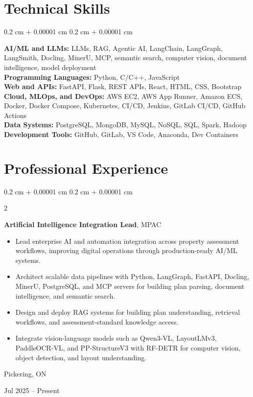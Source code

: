 \documentclass[10pt, letterpaper]{article}
\newenvironment{highlights}{
    \begin{itemize}[
        topsep=0.10 cm,
        parsep=0.10 cm,
        partopsep=0pt,
        itemsep=0pt,
        leftmargin=0.4 cm + 10pt
    ]
}{
    \end{itemize}
} %
\newenvironment{onecolentry}{
    \begin{adjustwidth}{
        0.2 cm + 0.00001 cm
    }{
        0.2 cm + 0.00001 cm
    }
}{
    \end{adjustwidth}
} %
\newenvironment{twocolentry}[2][]{
    \onecolentry
    \def\secondColumn{#2}
    \setcolumnwidth{\fill, 4.5 cm}
    \begin{paracol}{2}
}{
    \switchcolumn \raggedleft \secondColumn
    \end{paracol}
    \endonecolentry
} %
\let\hrefWithoutArrow\href
\renewcommand{\href}[2]{\hrefWithoutArrow{#1}{#2}}
\begin{document}
        \vspace{-0.2 cm}

\section{Technical Skills}
\begin{onecolentry}
\textbf{AI/ML and LLMs:} LLMs, RAG, Agentic AI, LangChain, LangGraph, LangSmith, Docling, MinerU, MCP, semantic search, computer vision, document intelligence, model deployment\\
\textbf{Programming Languages:} Python, C/C++, JavaScript\\
\textbf{Web and APIs:} FastAPI, Flask, REST APIs, React, HTML, CSS, Bootstrap\\
\textbf{Cloud, MLOps, and DevOps:} AWS EC2, AWS App Runner, Amazon ECS, Docker, Docker Compose, Kubernetes, CI/CD, Jenkins, GitLab CI/CD, GitHub Actions\\
\textbf{Data Systems:} PostgreSQL, MongoDB, MySQL, NoSQL, SQL, Spark, Hadoop\\
\textbf{Development Tools:} GitHub, GitLab, VS Code, Anaconda, Dev Containers
\end{onecolentry}

        
\vspace{-0.2 cm}
\section{Professional Experience}

\begin{twocolentry}{
    Pickering, ON 

    Jul 2025 – Present
}
    \textbf{Artificial Intelligence Integration Lead}, MPAC


\begin{highlights}
    \item Lead enterprise AI and automation integration across property assessment workflows, improving digital operations through production-ready AI/ML systems.
    \item Architect scalable data pipelines with Python, LangGraph, FastAPI, Docling, MinerU, PostgreSQL, and MCP servers for building plan parsing, document intelligence, and semantic search.
    \item Design and deploy RAG systems for building plan understanding, retrieval workflows, and assessment-standard knowledge access.
    \item Integrate vision-language models such as Qwen3-VL, LayoutLMv3, PaddleOCR-VL, and PP-StructureV3 with RF-DETR for computer vision, object detection, and layout understanding.
\end{highlights}



\end{twocolentry}
\end{document}
